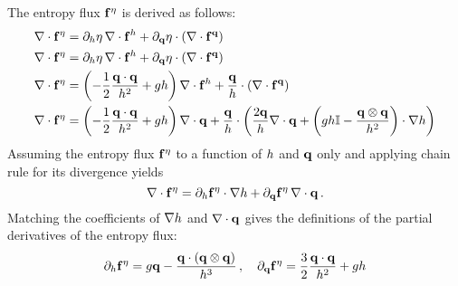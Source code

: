 The entropy flux $\mathbf{f}^\eta$ is
derived as follows:
\begin{align}
  \nabla\cdot\mathbf{f}^\eta
  &= 
    \partial_h\eta\,\nabla\cdot
    \mathbf{f}^h
  + \partial_{\mathbf{q}}\eta\cdot
    \left(\nabla\cdot\mathbf{f}^{\mathbf{q}}\right)
  \\
  \nabla\cdot\mathbf{f}^\eta
  &= 
    \partial_h\eta\,\nabla\cdot
    \mathbf{f}^h
  + \partial_{\mathbf{q}}\eta\cdot
    \left(\nabla\cdot\mathbf{f}^{\mathbf{q}}\right)
  \\
  \nabla\cdot\mathbf{f}^\eta
  &= 
    \left(-\frac{1}{2}\frac{\mathbf{q}\cdot\mathbf{q}}{h^2}
    + gh\right)
    \nabla\cdot\mathbf{f}^h
    + \frac{\mathbf{q}}{h}\cdot
    \left(\nabla\cdot\mathbf{f}^{\mathbf{q}}\right)
  \\
  \nabla\cdot\mathbf{f}^\eta
  &= 
    \left(-\frac{1}{2}\frac{\mathbf{q}\cdot\mathbf{q}}{h^2}
    + gh\right)
    \nabla\cdot\mathbf{q}
    + \frac{\mathbf{q}}{h}\cdot
    \left(\frac{2\mathbf{q}}{h}\nabla\cdot\mathbf{q}
    + \left(gh\mathbb{I}
    - \frac{\mathbf{q}\otimes\mathbf{q}}{h^2}\right)\cdot\nabla h\right)
\end{align}
Assuming the entropy flux $\mathbf{f}^\eta$ to a function
of $h$ and $\mathbf{q}$ only and applying chain rule for
its divergence yields
\begin{equation}
  \nabla\cdot\mathbf{f}^\eta
  = \partial_h\mathbf{f}^\eta\cdot\nabla h
  + \partial_{\mathbf{q}}\mathbf{f}^\eta
  \,\nabla\cdot\mathbf{q} \,.
\end{equation}
Matching the coefficients of $\nabla h$ and $\nabla\cdot\mathbf{q}$
gives the definitions of the partial derivatives of the entropy flux:
\begin{equation}\label{eq:shallowwater_entropy_pds}
  \partial_h\mathbf{f}^\eta
  = g\mathbf{q}
  - \frac{\mathbf{q}\cdot\left(\mathbf{q}\otimes\mathbf{q}\right)} 
  {h^3}
  \,,\quad
  \partial_{\mathbf{q}}\mathbf{f}^\eta
  = \frac{3}{2}\frac{\mathbf{q}\cdot\mathbf{q}}{h^2}
  + gh
\end{equation}
